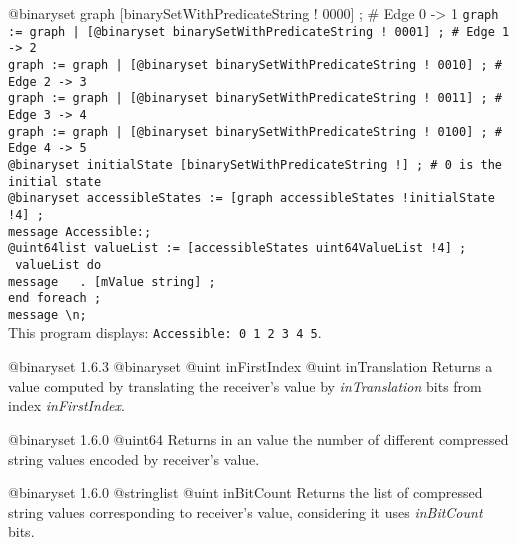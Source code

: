 \exempleUneLigne
{}
{@binaryset graph [binarySetWithPredicateString ! 0000\textquotedbl] ; \# Edge 0 -> 1}
\texttt{graph := graph | [@binaryset binarySetWithPredicateString ! 0001\textquotedbl] ; \# Edge 1 -> 2}\\
\texttt{graph := graph | [@binaryset binarySetWithPredicateString ! 0010\textquotedbl] ; \# Edge 2 -> 3}\\
\texttt{graph := graph | [@binaryset binarySetWithPredicateString ! 0011\textquotedbl] ; \# Edge 3 -> 4}\\
\texttt{graph := graph | [@binaryset binarySetWithPredicateString ! 0100\textquotedbl] ; \# Edge 4 -> 5}\\
\texttt{@binaryset initialState [binarySetWithPredicateString !\textquotedbl] ; \# 0 is the initial state}\\
\texttt{@binaryset accessibleStates := [graph accessibleStates !initialState !4] ;}\\
\texttt{message \textquotedbl Accessible:\textquotedbl ;}\\
\texttt{@uint64list valueList := [accessibleStates uint64ValueList !4] ;}\\
\texttt{ valueList do}\\
\texttt{message \textquotedbl~\textquotedbl~. [mValue string] ;}\\
\texttt{end foreach ;}\\
\texttt{message \textquotedbl\textbackslash n\textquotedbl ;}\\


This program displays: \texttt{Accessible: 0 1 2 3 4 5}.




{@binaryset}
{1.6.3}
{@binaryset}
{@uint inFirstIndex}
{@uint inTranslation}
{Returns a  value computed by translating the receiver's value by \emph{inTranslation} bits from index \emph{inFirstIndex}.}
{}



{@binaryset}
{1.6.0}
{@uint64}
{Returns in an  value the number of different compressed string values encoded by receiver's value.}
{}




{@binaryset}
{1.6.0}
{@stringlist}
{@uint inBitCount}
{Returns the list of compressed string values corresponding to receiver's value, considering it uses \emph{inBitCount} bits.}
{}










